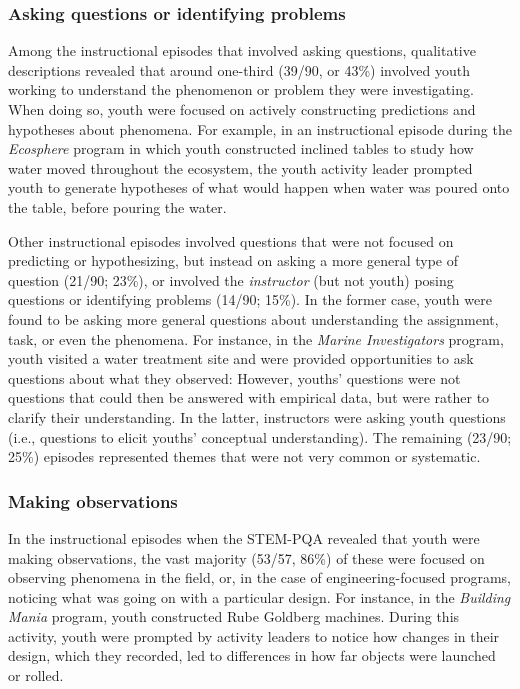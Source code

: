 \documentclass[]{book}
\theoremstyle{definition}
\theoremstyle{definition}
\theoremstyle{definition}
\theoremstyle{remark}
\begin{document}
\subsubsection{Asking questions or identifying
problems}\label{asking-questions-or-identifying-problems}

Among the instructional episodes that involved asking questions,
qualitative descriptions revealed that around one-third (39/90, or 43\%)
involved youth working to understand the phenomenon or problem they were
investigating. When doing so, youth were focused on actively
constructing predictions and hypotheses about phenomena. For example, in
an instructional episode during the \emph{Ecosphere} program in which
youth constructed inclined tables to study how water moved throughout
the ecosystem, the youth activity leader prompted youth to generate
hypotheses of what would happen when water was poured onto the table,
before pouring the water.

Other instructional episodes involved questions that were not focused on
predicting or hypothesizing, but instead on asking a more general type
of question (21/90; 23\%), or involved the \emph{instructor} (but not
youth) posing questions or identifying problems (14/90; 15\%). In the
former case, youth were found to be asking more general questions about
understanding the assignment, task, or even the phenomena. For instance,
in the \emph{Marine Investigators} program, youth visited a water
treatment site and were provided opportunities to ask questions about
what they observed: However, youths' questions were not questions that
could then be answered with empirical data, but were rather to clarify
their understanding. In the latter, instructors were asking youth
questions (i.e., questions to elicit youths' conceptual understanding).
The remaining (23/90; 25\%) episodes represented themes that were not
very common or systematic.

\subsubsection{Making observations}\label{making-observations}

In the instructional episodes when the STEM-PQA revealed that youth were
making observations, the vast majority (53/57, 86\%) of these were
focused on observing phenomena in the field, or, in the case of
engineering-focused programs, noticing what was going on with a
particular design. For instance, in the \emph{Building Mania} program,
youth constructed Rube Goldberg machines. During this activity, youth
were prompted by activity leaders to notice how changes in their design,
which they recorded, led to differences in how far objects were launched
or rolled.
\end{document}
